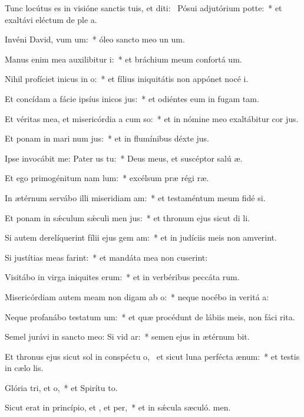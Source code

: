 \item Tunc locútus es in visióne sanctis tuis, et diti:~\pscross{} Pósui adjutórium  potte:~* et exaltávi eléctum de ple a.
\item Invéni David, vum um:~* óleo sancto meo un um.
\item Manus enim mea auxilibitur i:~* et bráchium meum confortá um.
\item Nihil profíciet inicus in o:~* et fílius iniquitátis non appónet nocé i.
\item Et concídam a fácie ipsíus inicos jus:~* et odiéntes eum in fugam tam.
\item Et véritas mea, et misericórdia a cum so:~* et in nómine meo exaltábitur cor jus.
\item Et ponam in mari num jus:~* et in flumínibus déxte jus.
\item Ipse invocábit me: Pater us  tu:~* Deus meus, et suscéptor salú æ.
\item Et ego primogénitum nam lum:~* excélsum præ régi ræ.
\item In ætérnum servábo illi miseridiam am:~* et testaméntum meum fidé si.
\item Et ponam in sǽculum sǽculi men jus:~* et thronum ejus sicut di li.
\item Si autem derelíquerint fílii ejus gem am:~* et in judíciis meis non amverint.
\item Si justítias meas farint:~* et mandáta mea non cuserint:
\item Visitábo in virga iniquites erum:~* et in verbéribus peccáta rum.
\item Misericórdiam autem meam non digam ab o:~* neque nocébo in veritá a:
\item Neque profanábo testatum um:~* et quæ procédunt de lábiis meis, non fáci rita.
\item Semel jurávi in sancto meo: Si vid ar:~* semen ejus in ætérnum bit.
\item Et thronus ejus sicut sol in conspéctu o,~\pscross{} et sicut luna perfécta  ænum:~* et testis in cælo lis.
\item Glória tri, et o,~* et Spirítu to.
\item Sicut erat in princípio, et , et per,~* et in sǽcula sæculó. men.
